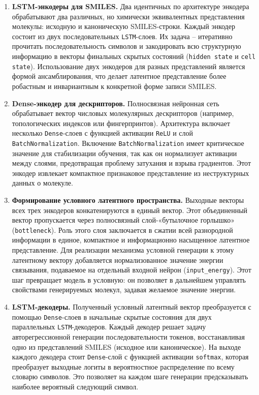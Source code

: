 \begin{enumerate}
	\item \textbf{LSTM-энкодеры для SMILES.} Два идентичных по архитектуре энкодера обрабатывают два различных, но химически эквивалентных представления молекулы: исходную и каноническую SMILES-строки. Каждый энкодер состоит из двух последовательных \texttt{LSTM}-слоев. Их задача -- итеративно прочитать последовательность символов и закодировать всю структурную информацию в векторы финальных скрытых состояний (\texttt{hidden state} и \texttt{cell state}). Использование двух энкодеров для разных представлений является формой ансамблирования, что делает латентное представление более робастным и инвариантным к конкретной форме записи SMILES.

	\item \textbf{Dense-энкодер для дескрипторов.} Полносвязная нейронная сеть обрабатывает вектор числовых молекулярных дескрипторов (например, топологических индексов или фингерпринтов). Архитектура включает несколько \texttt{Dense}-слоев с функцией активации \texttt{ReLU} и слой \texttt{BatchNormalization}. Включение \texttt{BatchNormalization} имеет критическое значение для стабилизации обучения, так как он нормализует активации между слоями, предотвращая проблему затухания и взрыва градиентов. Этот энкодер извлекает компактное признаковое представление из неструктурных данных о молекуле.

	\item \textbf{Формирование условного латентного пространства.} Выходные векторы всех трех энкодеров конкатенируются в единый вектор. Этот объединенный вектор пропускается через полносвязный слой-«бутылочное горлышко» (\texttt{bottleneck}). Роль этого слоя заключается в сжатии всей разнородной информации в единое, компактное и информационно насыщенное латентное представление. Для реализации механизма условной генерации к этому латентному вектору добавляется нормализованное значение энергии связывания, подаваемое на отдельный входной нейрон (\texttt{input\_energy}). Этот шаг превращает модель в условную: он позволяет в дальнейшем управлять свойствами генерируемых молекул, задавая желаемое значение энергии.

	\item \textbf{LSTM-декодеры.} Полученный условный латентный вектор преобразуется с помощью \texttt{Dense}-слоев в начальные скрытые состояния для двух параллельных \texttt{LSTM}-декодеров. Каждый декодер решает задачу авторегрессионной генерации последовательности токенов, восстанавливая одно из представлений SMILES (исходное или каноническое). На выходе каждого декодера стоит \texttt{Dense}-слой с функцией активации \texttt{softmax}, которая преобразует выходные логиты в вероятностное распределение по всему словарю символов. Это позволяет на каждом шаге генерации предсказывать наиболее вероятный следующий символ.
\end{enumerate}

